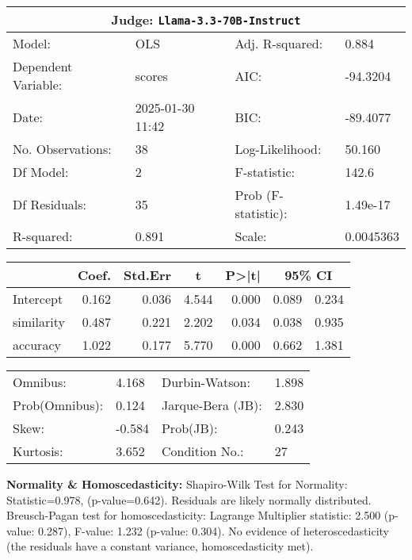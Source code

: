 \begin{center}
\small
\begin{tabular}{llll}
\toprule
\multicolumn{4}{c}{\textbf{Judge:} \texttt{Llama-3.3-70B-Instruct} \cite{meta2024llama33}} \\
\midrule
Model: & OLS & Adj. R-squared: & 0.884 \\
Dependent Variable: & scores & AIC: & -94.3204 \\
Date: & 2025-01-30 11:42 & BIC: & -89.4077 \\
No. Observations: & 38 & Log-Likelihood: & 50.160 \\
Df Model: & 2 & F-statistic: & 142.6 \\
Df Residuals: & 35 & Prob (F-statistic): & 1.49e-17 \\
R-squared: & 0.891 & Scale: & 0.0045363 \\
\bottomrule
\end{tabular}

\vspace{5pt}
\begin{tabular}{lrrrrrr}
\toprule
 & \multicolumn{1}{c}{Coef.} & \multicolumn{1}{c}{Std.Err} & \multicolumn{1}{c}{t} & \multicolumn{1}{c}{P>|t|} & \multicolumn{2}{c}{95\% CI} \\
\midrule
Intercept & 0.162 & 0.036 & 4.544 & 0.000 & 0.089 & 0.234 \\
similarity & 0.487 & 0.221 & 2.202 & 0.034 & 0.038 & 0.935 \\
accuracy & 1.022 & 0.177 & 5.770 & 0.000 & 0.662 & 1.381 \\
\bottomrule
\end{tabular}

\vspace{5pt}
\begin{tabular}{@{}ll@{\hspace{15pt}}ll@{}}
\toprule
Omnibus: & 4.168 & Durbin-Watson: & 1.898 \\
Prob(Omnibus): & 0.124 & Jarque-Bera (JB): & 2.830 \\
Skew: & -0.584 & Prob(JB): & 0.243 \\
Kurtosis: & 3.652 & Condition No.: & 27 \\
\bottomrule
\end{tabular}
\end{center}

\textbf{Normality \& Homoscedasticity:} Shapiro-Wilk Test for Normality: Statistic=0.978, (p-value=0.642).
Residuals are likely normally distributed.
Breusch-Pagan test for homoscedasticity:
Lagrange Multiplier statistic: 2.500
(p-value: 0.287), 
F-value: 1.232
(p-value: 0.304). 
No evidence of heteroscedasticity (the residuals have a constant variance, homoscedasticity met).


